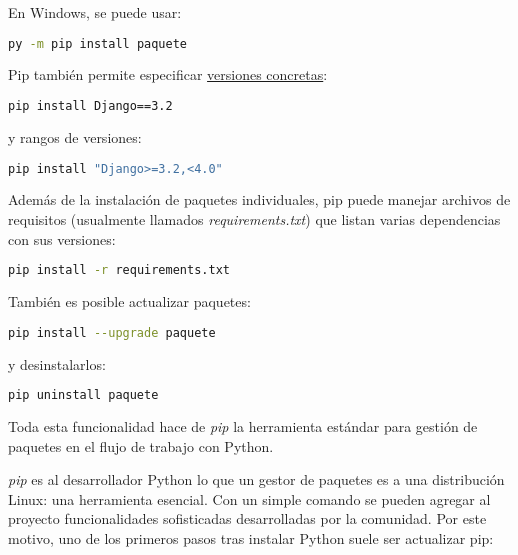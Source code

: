 En Windows, se puede usar:

\begin{lstlisting}[language=bash, caption={Uso del lanzador en Windows}]
py -m pip install paquete
\end{lstlisting}

Pip también permite especificar 
\href{https://packaging.python.org/en/latest/tutorials/installing-packages/}{versiones concretas}:

\begin{lstlisting}[language=bash, caption={Instalación de una versión específica}]
pip install Django==3.2
\end{lstlisting}

y rangos de versiones:

\begin{lstlisting}[language=bash, caption={Instalación con rango de versiones}]
pip install "Django>=3.2,<4.0"
\end{lstlisting}

Además de la instalación de paquetes individuales, pip puede manejar archivos de 
requisitos (usualmente llamados \textit{requirements.txt}) que listan varias 
dependencias con sus versiones:

\begin{lstlisting}[language=bash, caption={Instalación desde requirements.txt}]
pip install -r requirements.txt
\end{lstlisting}

También es posible actualizar paquetes:

\begin{lstlisting}[language=bash, caption={Actualización de un paquete}]
pip install --upgrade paquete
\end{lstlisting}

y desinstalarlos:

\begin{lstlisting}[language=bash, caption={Desinstalación de un paquete}]
pip uninstall paquete
\end{lstlisting}

Toda esta funcionalidad hace de \textit{pip} la herramienta estándar para gestión de 
paquetes en el flujo de trabajo con Python. 

\textit{pip} es al desarrollador Python lo que un gestor de paquetes es a una 
distribución Linux: una herramienta esencial. Con un simple comando se 
pueden agregar al proyecto funcionalidades sofisticadas desarrolladas por 
la comunidad. Por este motivo, uno de los primeros pasos tras instalar Python 
suele ser actualizar pip:

